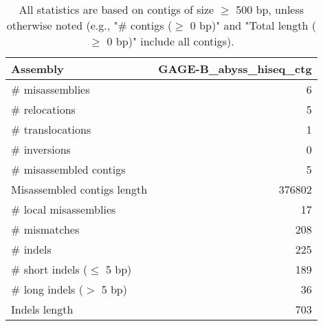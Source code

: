 \documentclass[12pt,a4paper]{article}
\begin{document}
\begin{table}[ht]
\begin{center}
\caption{All statistics are based on contigs of size $\geq$ 500 bp, unless otherwise noted (e.g., "\# contigs ($\geq$ 0 bp)" and "Total length ($\geq$ 0 bp)" include all contigs).}
\begin{tabular}{|l*{1}{|r}|}
\hline
Assembly & GAGE-B\_abyss\_hiseq\_ctg \\ \hline
\# misassemblies & 6 \\ \hline
\hspace{5mm}\# relocations & 5 \\ \hline
\hspace{5mm}\# translocations & 1 \\ \hline
\hspace{5mm}\# inversions & 0 \\ \hline
\# misassembled contigs & 5 \\ \hline
Misassembled contigs length & 376802 \\ \hline
\# local misassemblies & 17 \\ \hline
\# mismatches & 208 \\ \hline
\# indels & 225 \\ \hline
\hspace{5mm}\# short indels ($\leq$ 5 bp) & 189 \\ \hline
\hspace{5mm}\# long indels ($>$ 5 bp) & 36 \\ \hline
Indels length & 703 \\ \hline
\end{tabular}
\end{center}
\end{table}
\end{document}
